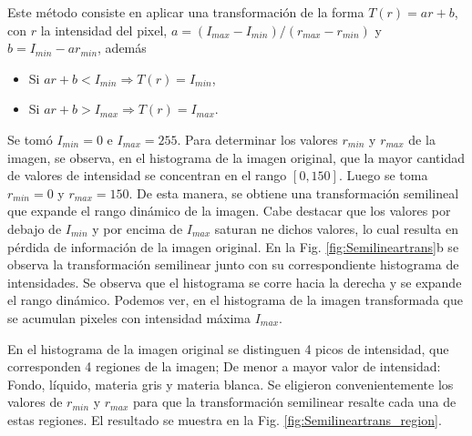 \documentclass[11pt,twocolumn,twoside]{opticajnl}
\begin{document}
Este método consiste en aplicar una transformación de la forma $T(r) = a r + b$, con $r$ la intensidad del pixel, $a = (I_{max} - I_{min})/(r_{max}-r_{min})$ y $b=I_{min} - ar_{min}$, además
\begin{itemize}
    \item Si $a r + b < I_{min} \Rightarrow T(r)=I_{min}$,
    \item Si $a r + b > I_{max} \Rightarrow T(r)=I_{max}$.
\end{itemize}
Se tomó $I_{min}=0$ e $I_{max}=255$. Para determinar los valores $r_{min}$ y $r_{max}$ de la imagen, se observa, en el histograma de la imagen original, que la mayor cantidad de valores de intensidad se concentran en el rango $[0, 150]$. Luego se toma $r_{min}=0$ y $r_{max}=150$. De esta manera, se obtiene una transformación semilineal que expande el rango dinámico de la imagen. Cabe destacar que los valores por debajo de $I_{min}$ y por encima de $I_{max}$ saturan ne dichos valores, lo cual resulta en pérdida de información de la imagen original. En la Fig. \ref{fig:Semilineartrans}b se observa la transformación semilinear junto con su correspondiente histograma de intensidades. Se observa que el histograma se corre hacia la derecha y se expande el rango dinámico. Podemos ver, en el histograma de la imagen transformada que se acumulan pixeles con intensidad máxima $I_{max}$.

En el histograma de la imagen original se distinguen 4 picos de intensidad, que corresponden 4 regiones de la imagen; De menor a mayor valor de intensidad: Fondo, líquido, materia gris y materia blanca. Se eligieron convenientemente los valores de $r_{min}$ y $r_{max}$ para que la transformación semilinear resalte cada una de estas regiones. El resultado se muestra en la Fig. \ref{fig:Semilineartrans_region}.
\end{document}
